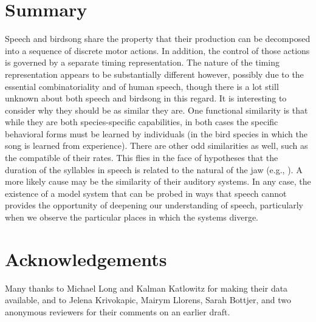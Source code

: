 \documentclass[output=paper,
modfonts
]{LSP/langsci}
\begin{document}
\newpage 
\section{Summary}

Speech and birdsong share the property that their production can be decomposed into a sequence of discrete motor actions. In addition, the control of those actions is governed by a  separate timing representation.  The nature of the timing representation appears to be substantially different however, possibly due to the essential combinatoriality and  of human speech, though there is a lot still unknown about both speech and birdsong in this regard. It is interesting to consider why they should be as similar they are. One functional similarity is that while they are both species-specific capabilities, in both cases the specific behavioral forms must be learned by individuals (in the bird species in which the song is learned from experience). There are other odd similarities as well, such as the compatible  of their  rates. This flies in the face of hypotheses that the duration of the syllables in speech is related to the natural  of the jaw (e.g., \citealt{Davis}). A more likely cause may be the similarity of their auditory systems. In any case, the existence of a model system that can be probed in ways that speech cannot provides the opportunity of deepening our understanding of speech, particularly when we observe the particular places in which the systems diverge.



\section*{Acknowledgements}
Many thanks to Michael Long and Kalman  Katlowitz for making their data available, and to Jelena Krivokapic, Mairym Llorens, Sarah Bottjer, and two anonymous reviewers for their comments on an earlier draft.


{\sloppy
\printbibliography[heading=subbibliography,notkeyword=this]
}
\end{document}
